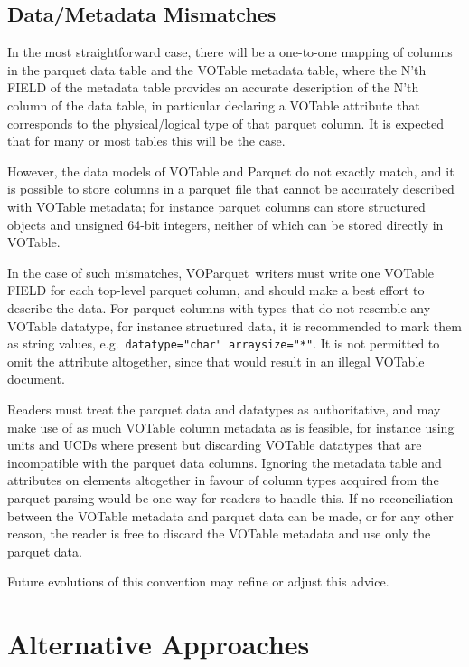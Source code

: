 \documentclass[11pt,a4paper]{ivoa}
\newcommand{\voparquet}{VOParquet}
\begin{document}
\subsection{Data/Metadata Mismatches}

In the most straightforward case, there will be a one-to-one mapping
of columns in the parquet data table and the VOTable metadata table,
where the N'th FIELD of the metadata table provides an accurate
description of the N'th column of the data table,
in particular declaring a VOTable  attribute that
corresponds to the physical/logical type of that parquet column.
It is expected that for many or most tables this will be the case.

However, the data models of VOTable and Parquet do not exactly match,
and it is possible to store columns in a parquet file that cannot be
accurately described with VOTable metadata;
for instance parquet columns can store structured objects and
unsigned 64-bit integers, neither of which can be stored directly
in VOTable.

In the case of such mismatches,
\voparquet\ writers must write one VOTable FIELD
for each top-level parquet column,
and should make a best effort to describe the data.
For parquet columns with types that do not resemble any VOTable datatype,
for instance structured data, it is recommended to mark them as
string values, e.g.\ \verb|datatype="char" arraysize="*"|.
It is not permitted to omit the  attribute altogether,
since that would result in an illegal VOTable document.

Readers must treat the parquet data and datatypes as authoritative,
and may make use of as much VOTable column metadata as is feasible,
for instance using units and UCDs where present but discarding
VOTable datatypes that are incompatible with the parquet data columns.
Ignoring the metadata table  and  attributes
on  elements altogether in favour of column types acquired
from the parquet parsing would be one way for readers to handle this.
If no reconciliation between the VOTable metadata and
parquet data can be made, or for any other reason,
the reader is free to discard the VOTable metadata and use only
the parquet data.

Future evolutions of this convention may refine or adjust this advice.

\section{Alternative Approaches}
\end{document}
